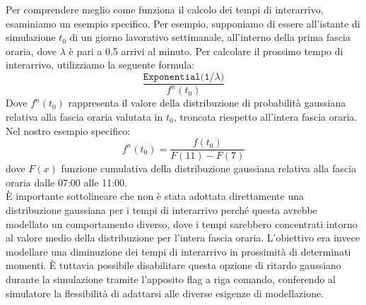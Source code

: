 \documentclass[a4paper, 12pt]{article}
\begin{document}
Per comprendere meglio come funziona il calcolo dei tempi di interarrivo, esaminiamo un esempio specifico. Per esempio, supponiamo di essere all'istante di simulazione $t_0$ di un giorno lavorativo settimanale, all'interno della prima fascia oraria, dove $\lambda$ è pari a 0.5 arrivi al minuto. Per calcolare il prossimo tempo di interarrivo, utilizziamo la seguente formula:
\[
	\frac{\texttt{Exponential(1/}\lambda)}{f^n(t_0)}
\]
Dove $f^n(t_0)$ rappresenta il valore della distribuzione di probabilità gaussiana relativa alla fascia oraria valutata in $t_0$, troncata riespetto all'intera fascia oraria. Nel nostro esempio specifico:
\[
	f^n(t_0) = \frac{f(t_0)}{F(11) - F(7)}
\]
dove $F(x)$ funzione cumulativa della distribuzione gaussiana relativa alla fascia oraria dalle 07:00 alle 11:00.\\

È importante sottolineare che non è stata adottata direttamente una distribuzione gaussiana per i tempi di interarrivo perché questa avrebbe modellato un comportamento diverso, dove i tempi sarebbero concentrati intorno al valore medio della distribuzione per l'intera fascia oraria. L'obiettivo era invece modellare una diminuzione dei tempi di interarrivo in prossimità di determinati momenti. È tuttavia possibile disabilitare questa opzione di ritardo gaussiano durante la simulazione tramite l'apposito flag a riga comando, conferendo al simulatore la flessibilità di adattarsi alle diverse esigenze di modellazione.
\end{document}
